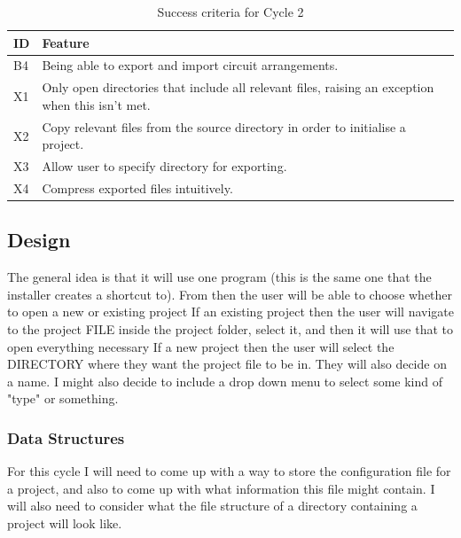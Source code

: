 \documentclass[11pt]{article}
\begin{document}
                \begin{table}[!ht]
                    \centering
                    \begin{tabular}{m{16pt}m{}}
                        ID & Feature \\ \hline
                        B4 & Being able to export and import circuit arrangements. \\ 
                        X1 & Only open directories that include all relevant files, raising an exception when this isn't met. \\ 
                        X2 & Copy relevant files from the source directory in order to initialise a project. \\ 
                        X3 & Allow user to specify directory for exporting. \\ 
                        X4 & Compress exported files intuitively. \\ 
                    \end{tabular}
                    \caption{Success criteria for Cycle 2}
                    \label{tbl:succ_crit_c2}
                \end{table}


        \subsection{Design}
            The general idea is that it will use one program (this is the same one that the installer creates a shortcut to).
            From then the user will be able to choose whether to open a new or existing project
            If an existing project then the user will navigate to the project FILE inside the project folder, select it, and then it will use that to open everything necessary
            If a new project then the user will select the DIRECTORY where they want the project file to be in. They will also decide on a name. I might also decide to include a drop down menu to select some kind of "type" or something.

            \subsubsection{Data Structures}
                For this cycle I will need to come up with a way to store the configuration file for a project, and also to come up with what information this file might contain. I will also need to consider what the file structure of a directory containing a project will look like. 
\end{document}
